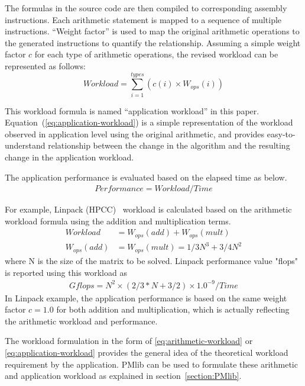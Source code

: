 \documentclass[conference]{IEEEtran}
\begin{document}
The formulas in the source code are then compiled to corresponding assembly
instructions.
Each arithmetic statement is mapped to a sequence of multiple instructions.
``Weight factor'' is used to map the original arithmetic operations to the
generated instructions to quantify the relationship.
Assuming a simple weight factor $ c $ for each type of
arithmetic operations, 
the revised workload can be represented as follows:
\begin{equation}\label{eq:application-workload}
		Workload = \sum_{i=1}^{types} \left(c(i)\times W_{ops}(i)\right)
\end{equation}

\noindent This workload formula is named ``application workload'' in this paper.
Equation~(\ref{eq:application-workload})
is a simple representation of the workload observed in application level 
using the original arithmetic,
and provides easy-to-understand relationship between the change
in the algorithm and the resulting change in the application workload.

The application performance is evaluated based on the elapsed time as below.
\begin{align}\label{eq:performance-workload-time}
Performance = Workload / Time 
\end{align}

\noindent For example, Linpack (HPCC)~\cite{}
workload is calculated based on the arithmetic workload formula
using the addition and multiplication terms.
\begin{align}
		Workload & = W_{ops}(add) + W_{ops}(mult) \\
		W_{ops}(add) & = W_{ops}(mult) = 1/3 N^{3} + 3/4 N^{2}
\end{align}
where N is the size of the matrix to be solved.
Linpack performance value "flops" is reported using this workload as
\begin{align*}
Gflops = N^{2} \times ( 2/3 * N + 3/2 ) \times 1.0^{-9} / Time 
\end{align*}
In Linpack example, the application performance is based on
the same weight factor $ c = 1.0 $ 
for both addition and multiplication, which is actually reflecting the
arithmetic workload and performance.

The workload formulation in the form of
\eqref{eq:arithmetic-workload}
or
\eqref{eq:application-workload}
provides the general idea of the theoretical workload requirement by the
application.
PMlib can be used to formulate these arithmetic and application workload
as explained in section~\ref{section:PMlib}.
\end{document}
